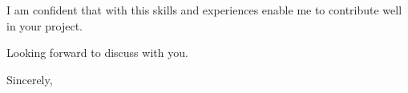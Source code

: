 \documentclass[
	pagenumber=false, %
	parskip=half, %
	fromalign=right, %
	foldmarks=false, %
	addrfield=false %
	]{scrlttr2}
\begin{document}
\begin{letter}
I am confident that with this skills and experiences enable me to contribute well in your project. 
 

Looking forward to discuss with you.


\closing{Sincerely,}



\end{letter}
 
\end{document}
